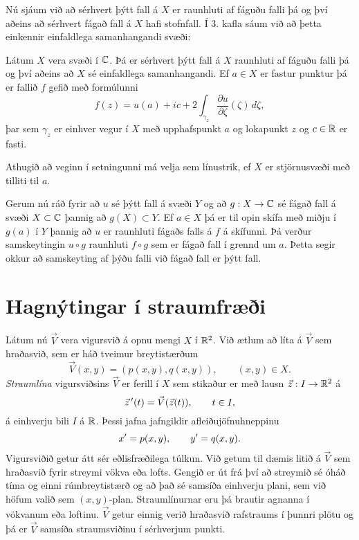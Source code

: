 Nú sjáum við að sérhvert þýtt fall á $X$ er raunhluti af fáguðu falli
þá og því aðeins að sérhvert fágað fall á $X$ hafi stofnfall. Í
3. kafla  sáum við að  þetta einkennir einfaldlega samanhangandi
svæði:

\begin{se}  Látum $X$ vera svæði í ${\mathbb C}$.  Þá er sérhvert þýtt fall á
$X$ raunhluti af fáguðu falli þá og því aðeins að $X$ sé einfaldlega
samanhangandi.   Ef $a\in X$ er fastur punktur þá er fallið
$f$ gefið með formúlunni
$$
f(z)=u(a)+ic+2\int_{\gamma_z} \dfrac{\partial u}{\partial
\zeta}(\zeta) \, d\zeta,
$$
þar sem $\gamma_z$ er einhver vegur í $X$ með upphafspunkt $a$ og
lokapunkt $z$ og $c\in {\mathbb R}$ er fasti.
\end{se}


Athugið að veginn í setningunni má velja sem línustrik, ef 
$X$ er stjörnusvæði með tilliti til $a$.

\medskip
Gerum nú ráð fyrir að $u$ sé þýtt fall á svæði $Y$ og að 
$g:X\to {\mathbb C}$ sé fágað fall á svæði $X\subset {\mathbb C}$ þannig að 
$g(X)\subset Y$.  Ef $a\in  X$ þá er til opin skífa með miðju í 
$g(a)$ í $Y$ þannig að $u$ er raunhluti fágaðs falls á 
$f$ á skífunni.  Þá verður samskeytingin $u\circ g$ raunhluti 
$f\circ g$ sem er fágað fall í grennd um $a$.  Þetta segir okkur að
samskeyting af þýðu falli við fágað fall er þýtt fall.
 

\section{Hagnýtingar í straumfræði}  

\noindent
Látum nú $\vec V$ vera vigursvið á opnu mengi $X$ í ${\mathbb R}^2$.  Við ætlum
að líta á $\vec V$ sem hraðasvið, sem er háð tveimur breytistærðum
$$
\vec V(x,y)= (p(x,y), q(x,y)), \qquad (x,y)\in X.
$$
{\it Straumlína} vigursviðsins $\vec V$ er
ferill
í $X$ sem stikaður er með lausn $\vec z:I\to {\mathbb R}^2$ á
\begin{equation*}
\vec z\, {\sp{\prime}}(t)=\vec V(\vec z(t)), \qquad t\in I,
\label{4.7.1}
\end{equation*}
á einhverju bili $I$ á ${\mathbb R}$.  Þessi jafna jafngildir afleiðujöfnuhneppinu
\begin{equation*}
x{\sp{\prime}}=p(x,y), \qquad y{\sp{\prime}}=q(x,y).
\label{4.7.2}
\end{equation*}
Vigursviðið getur átt sér eðlisfræðilega túlkun.  Við getum til dæmis
litið á $\vec V$ sem hraðasvið fyrir streymi vökva eða lofts.  Gengið
er út frá því að streymið sé óháð tíma og einni rúmbreytistærð og að
það sé samsíða einhverju plani, sem við höfum valið sem $(x,y)$-plan. 
Straumlínurnar eru þá brautir agnanna í vökvanum eða loftinu.  $\vec V$
getur einnig verið hraðasvið rafstraums  í þunnri plötu og þá er
$\vec V$ samsíða straumsviðinu í sérhverjum punkti.



